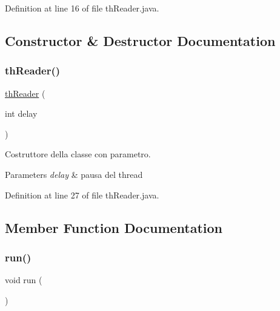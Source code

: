 Definition at line 16 of file th\+Reader.\+java.



\subsection{Constructor \& Destructor Documentation}
\mbox{\label{class_snake_1_1game_1_1threads_1_1th_reader_a9b984c882a0834ce79bbe3f2dac8b1c5}} 
\subsubsection{\texorpdfstring{th\+Reader()}{thReader()}}
{\footnotesize\ttfamily \mbox{\hyperlink{class_snake_1_1game_1_1threads_1_1th_reader}{th\+Reader}} (\begin{DoxyParamCaption}\item[{int}]{delay }\end{DoxyParamCaption})}



Costruttore della classe con parametro. 


\begin{DoxyParams}{Parameters}
{\em delay} & pausa del thread \\
\hline
\end{DoxyParams}


Definition at line 27 of file th\+Reader.\+java.



\subsection{Member Function Documentation}
\mbox{\label{class_snake_1_1game_1_1threads_1_1th_reader_a13a43e6d814de94978c515cb084873b1}} 
\subsubsection{\texorpdfstring{run()}{run()}}
{\footnotesize\ttfamily void run (\begin{DoxyParamCaption}{ }\end{DoxyParamCaption})}



